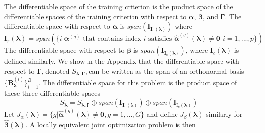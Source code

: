 \documentclass[12pt]{article}
\begin{document}
The differentiable space of the training criterion is the product space of the differentiable spaces of the training criterion with respect to $\boldsymbol{\alpha}$, $\boldsymbol{\beta}$, and $\boldsymbol{\Gamma}$. The differentiable space with respect to $\boldsymbol{\alpha}$ is  $span(\boldsymbol{I}_{\boldsymbol{I}_r(\boldsymbol\lambda)})$ where
$$
\boldsymbol{I}_r(\boldsymbol\lambda)
= 
span(\{
i | \boldsymbol{\alpha}^{(g)} \text{ that contains index } i \text{ satisfies }
\hat{\boldsymbol{\alpha}}^{(g)}(\boldsymbol{\lambda}) \ne \boldsymbol{0}, i=1,...,p
\})
$$ 
The differentiable space with respect to $\boldsymbol{\beta}$ is $span(\boldsymbol{I}_{\boldsymbol{I}_c(\boldsymbol\lambda)})$, where $\boldsymbol{I}_c(\boldsymbol\lambda)$ is defined similarly. We show in the Appendix that the differentiable space with respect to $\boldsymbol{\Gamma}$, denoted $S_{\boldsymbol \lambda, \boldsymbol{\Gamma}}$, can be written as the span of an orthonormal basis $\{\boldsymbol{B}^{(i)}_{\boldsymbol{\lambda}}\}_{i=1}^{B}$.
The differentiable space for this problem is the product space of these three differentiable spaces
\begin{equation}
S_{\boldsymbol \lambda} 
= 
S_{\boldsymbol \lambda, \boldsymbol{\Gamma}} 
\oplus span(\boldsymbol{I}_{\boldsymbol{I}_r(\boldsymbol\lambda)})
\oplus span(\boldsymbol{I}_{\boldsymbol{I}_c(\boldsymbol\lambda)})
\label{eq:matrix_completion_diff_space}
\end{equation}
Let $J_\alpha(\boldsymbol{\lambda}) = \{g | \hat{\boldsymbol{\alpha}}^{(g)}(\boldsymbol{\lambda}) \ne \boldsymbol{0}, g = 1,...,G \}$ and define $J_\beta(\boldsymbol{\lambda})$ similarly for $\hat{\boldsymbol{\beta}}(\boldsymbol{\lambda})$.
A locally equivalent joint optimization problem is then
\end{document}
